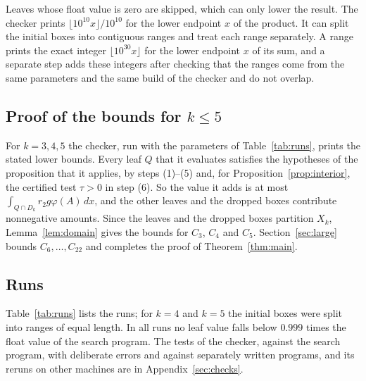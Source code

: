 \documentclass[11pt]{amsart}
\theoremstyle{definition}
\theoremstyle{remark}
\numberwithin{equation}{section}
\newcommand{\KmaxW}{22}
\newcommand{\Kmax}{\KmaxW}
\begin{document}
Leaves whose float value is zero are skipped, which can only lower the result. The checker prints $\lfloor10^{10}x\rfloor/10^{10}$ for the lower endpoint $x$ of the product. It can split the initial boxes into contiguous ranges and treat each range separately. A range prints the exact integer $\lfloor10^{30}x\rfloor$ for the lower endpoint $x$ of its sum, and a separate step adds these integers after checking that the ranges come from the same parameters and the same build of the checker and do not overlap.

\subsection{Proof of the bounds for \texorpdfstring{$k\le5$}{k <= 5}}\label{sec:proof5}
For $k=3,4,5$ the checker, run with the parameters of Table~\ref{tab:runs}, prints the stated lower bounds. Every leaf $Q$ that it evaluates satisfies the hypotheses of the proposition that it applies, by steps (1)--(5) and, for Proposition~\ref{prop:interior}, the certified test $\tau>0$ in step (6). So the value it adds is at most $\int_{Q\cap D_k}r_2g\varphi(A)\,dx$, and the other leaves and the dropped boxes contribute nonnegative amounts. Since the leaves and the dropped boxes partition $X_k$, Lemma~\ref{lem:domain} gives the bounds for $C_3$, $C_4$ and $C_5$. Section~\ref{sec:large} bounds $C_6,\dots,C_{\Kmax}$ and completes the proof of Theorem~\ref{thm:main}.

\subsection{Runs}\label{sec:runs}
Table~\ref{tab:runs} lists the runs; for $k=4$ and $k=5$ the initial boxes were split into ranges of equal length. In all runs no leaf value falls below $0.999$ times the float value of the search program. The tests of the checker, against the search program, with deliberate errors and against separately written programs, and its reruns on other machines are in Appendix~\ref{sec:checks}.
\end{document}
